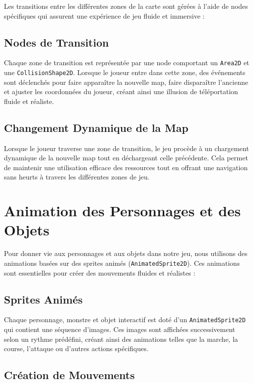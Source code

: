 Les transitions entre les différentes zones de la carte sont gérées à l'aide de nodes spécifiques qui assurent une expérience de jeu fluide et immersive :

\subsection*{Nodes de Transition}

Chaque zone de transition est représentée par une node comportant un \texttt{Area2D} et une \texttt{CollisionShape2D}.
 Lorsque le joueur entre dans cette zone, des événements sont déclenchés pour faire apparaître la nouvelle map, faire disparaître l'ancienne et ajuster les coordonnées du joueur, créant ainsi une illusion de téléportation fluide et réaliste.

\subsection*{Changement Dynamique de la Map}

Lorsque le joueur traverse une zone de transition, le jeu procède à un chargement dynamique de la nouvelle map tout en 
déchargeant celle précédente. Cela permet de maintenir une utilisation efficace des ressources tout en offrant une navigation sans heurts à 
travers les différentes zones de jeu.

\section*{Animation des Personnages et des Objets}

Pour donner vie aux personnages et aux objets dans notre jeu, nous utilisons des animations basées sur des sprites animés
 (\texttt{AnimatedSprite2D}). Ces animations sont essentielles pour créer des mouvements fluides et réalistes :

\subsection*{Sprites Animés}

Chaque personnage, monstre et objet interactif est doté d'un \texttt{AnimatedSprite2D} qui contient une séquence d'images. 
Ces images sont affichées successivement selon un rythme prédéfini, créant ainsi des animations telles que la marche, la course, l'attaque ou d'autres actions spécifiques.

\subsection{Création de Mouvements}

